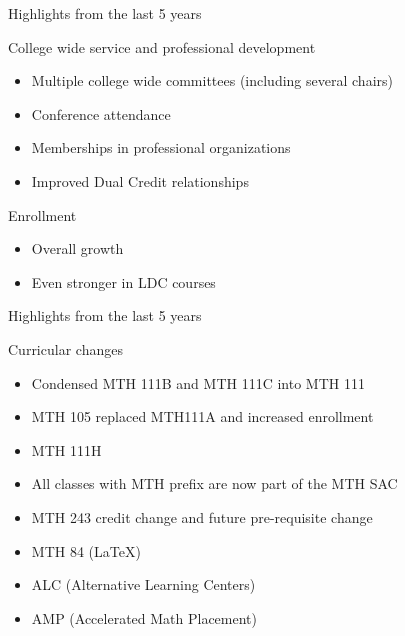 \documentclass{beamer}
\begin{document}
\begin{frame}{Highlights from the last 5 years}
 \begin{block}{College wide service and professional development}
	\begin{itemize}
	 \item Multiple college wide committees (including several chairs)
	 \item Conference attendance
	 \item Memberships in professional organizations
	 \item Improved Dual Credit relationships
	\end{itemize}
\end{block}

 \begin{block}{Enrollment}
	\begin{itemize}
	\item Overall growth
	 \item Even stronger in LDC courses
	\end{itemize}
\end{block}

\end{frame}

\begin{frame}{Highlights from the last 5 years}
\begin{block}{Curricular changes}
	\begin{itemize}
	 \item  Condensed MTH 111B and MTH 111C into MTH 111
	 \item MTH 105 replaced MTH111A and increased enrollment
	 \item MTH 111H
	 \item All classes with MTH prefix are now part of the MTH SAC 
	 \item MTH 243 credit change and future pre-requisite change
	 \item MTH 84 (\LaTeX)
	 \item ALC (Alternative Learning Centers) %
	 \item AMP (Accelerated Math Placement) %
	\end{itemize}
\end{block}
\end{frame}
 
\end{document}
